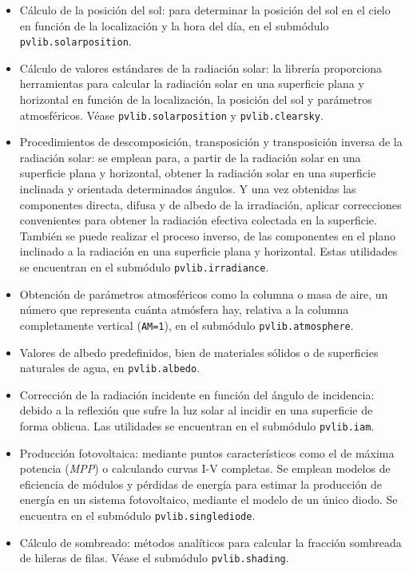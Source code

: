 \begin{itemize}
      \item Cálculo de la posición del sol: para determinar la posición del sol en el cielo en función de la localización y la hora del día, en el submódulo \lstinline{pvlib.solarposition}.
      \item Cálculo de valores estándares de la radiación solar: la librería proporciona herramientas para calcular la radiación solar en una superficie plana y horizontal en función de la localización, la posición del sol y parámetros atmosféricos. Véase \lstinline{pvlib.solarposition} y \lstinline{pvlib.clearsky}.
      \item Procedimientos de descomposición, transposición y transposición inversa de la radiación solar: se emplean para, a partir de la radiación solar en una superficie plana y horizontal, obtener la radiación solar en una superficie inclinada y orientada determinados ángulos. Y una vez obtenidas las componentes directa, difusa y de albedo de la irradiación, aplicar correcciones convenientes para obtener la radiación efectiva colectada en la superficie. También se puede realizar el proceso inverso, de las componentes en el plano inclinado a la radiación en una superficie plana y horizontal. Estas utilidades se encuentran en el submódulo \lstinline{pvlib.irradiance}.
      \item Obtención de parámetros atmosféricos como la columna o masa de aire, un número que representa cuánta atmósfera hay, relativa a la columna completamente vertical (\lstinline{AM=1}), en el submódulo \lstinline{pvlib.atmosphere}.
      \item Valores de albedo predefinidos, bien de materiales sólidos o de superficies naturales de agua, en \lstinline{pvlib.albedo}.
      \item Corrección de la radiación incidente en función del ángulo de incidencia: debido a la reflexión que sufre la luz solar al incidir en una superficie de forma oblicua. Las utilidades se encuentran en el submódulo \lstinline{pvlib.iam}.
      \item Producción fotovoltaica: mediante puntos característicos como el de máxima potencia (\textit{MPP}) o calculando curvas I-V completas. Se emplean modelos de eficiencia de módulos y pérdidas de energía para estimar la producción de energía en un sistema fotovoltaico, mediante el modelo de un único diodo. Se encuentra en el submódulo \lstinline{pvlib.singlediode}.
      \item Cálculo de sombreado: métodos analíticos para calcular la fracción sombreada de hileras de filas. Véase el submódulo \lstinline{pvlib.shading}.

\end{itemize}
